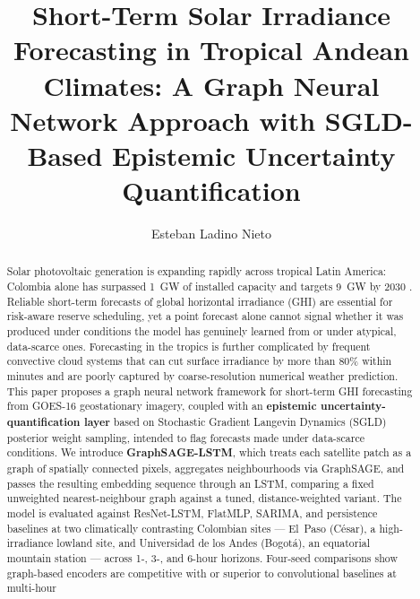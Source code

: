 \documentclass[a4paper,fleqn]{cas-sc}
\begin{document}

\title[mode=title]{Short-Term Solar Irradiance Forecasting in Tropical Andean Climates: A Graph Neural Network Approach with SGLD-Based Epistemic Uncertainty Quantification}

\author[1]{Esteban Ladino Nieto}
\cormark[1]



\begin{abstract}
Solar photovoltaic generation is expanding rapidly across tropical Latin
America: Colombia alone has surpassed 1~GW of installed capacity and targets
9~GW by 2030 \citep{upme2023}. Reliable short-term forecasts of global
horizontal irradiance (GHI) are essential for risk-aware reserve scheduling,
yet a point forecast alone cannot signal whether it was produced under
conditions the model has genuinely learned from or under atypical,
data-scarce ones. Forecasting in the tropics is further complicated by
frequent convective cloud systems that can cut surface irradiance by more
than 80\% within minutes and are poorly captured by coarse-resolution
numerical weather prediction. This paper proposes a graph neural network
framework for short-term GHI forecasting from GOES-16 geostationary imagery,
coupled with an \textbf{epistemic uncertainty-quantification layer} based on
Stochastic Gradient Langevin Dynamics (SGLD) posterior weight sampling,
intended to flag forecasts made under data-scarce conditions. We introduce
\textbf{GraphSAGE-LSTM}, which treats each satellite patch as a graph of
spatially connected pixels, aggregates neighbourhoods via GraphSAGE, and
passes the resulting embedding sequence through an LSTM, comparing a fixed
unweighted nearest-neighbour graph against a tuned, distance-weighted
variant. The model is evaluated against ResNet-LSTM, FlatMLP, SARIMA, and
persistence baselines at two climatically contrasting Colombian sites ---
El~Paso (C{\'e}sar), a high-irradiance lowland site, and Universidad de los
Andes (Bogot{\'a}), an equatorial mountain station --- across 1-, 3-, and
6-hour horizons. Four-seed comparisons show graph-based encoders are
competitive with or superior to convolutional baselines at multi-hour

\end{abstract}
\end{document}
